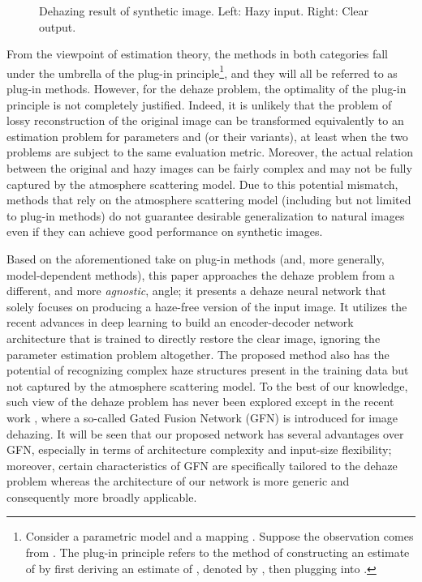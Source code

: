 \documentclass[journal]{IEEEtran}
\begin{document}
\begin{figure}
	\subfigure{
		\texttt{[image: 1]}}
	\hspace{0in}
	\captionsetup{justification=centering}
	\centering\caption{Dehazing result of synthetic image. Left: Hazy input. Right: Clear output.}
\end{figure}

From the  viewpoint of estimation theory, the methods in both categories fall under the umbrella of the plug-in principle\footnote{Consider a parametric model  and a mapping . Suppose the observation comes from . The plug-in principle refers to the method of constructing an estimate of  by first deriving an estimate of , denoted by , then plugging  into .}, and they will all be referred to as plug-in methods. 
However, for the dehaze problem, the optimality of the plug-in principle is not completely justified. Indeed, it is unlikely that the problem of lossy reconstruction of the original image can be transformed equivalently to an estimation problem for  parameters  and  (or their variants), at least when the two problems are subject to the same evaluation metric. Moreover, the actual relation between the original and hazy images  can be fairly complex and may not be fully captured by the atmosphere scattering model. Due to this potential mismatch, methods that rely on the atmosphere scattering model (including but not limited to plug-in methods) do not guarantee desirable generalization to natural images even if they can achieve good performance on synthetic images.








Based on the aforementioned take on plug-in methods (and, more generally, model-dependent methods), this paper approaches the dehaze problem from a different, and more \textit{agnostic}, angle; it presents a dehaze neural network that solely focuses on producing a haze-free version of the input image. It utilizes the recent advances in deep learning to build an encoder-decoder network architecture that is  trained to directly restore the clear image, ignoring the parameter estimation problem altogether. The proposed method also has the potential of recognizing complex haze structures present in the training data but not captured by the atmosphere scattering model. To the best of our knowledge, such view of the dehaze problem has never been explored except in the recent work  \cite{GFN}, where a so-called Gated Fusion Network (GFN) is introduced for image dehazing. It will be seen that our proposed network has several advantages over GFN, especially in terms of architecture complexity and input-size flexibility; moreover, certain characteristics of GFN are specifically tailored to the dehaze problem whereas the architecture of our network is more generic and consequently more broadly applicable. 
\end{document}
